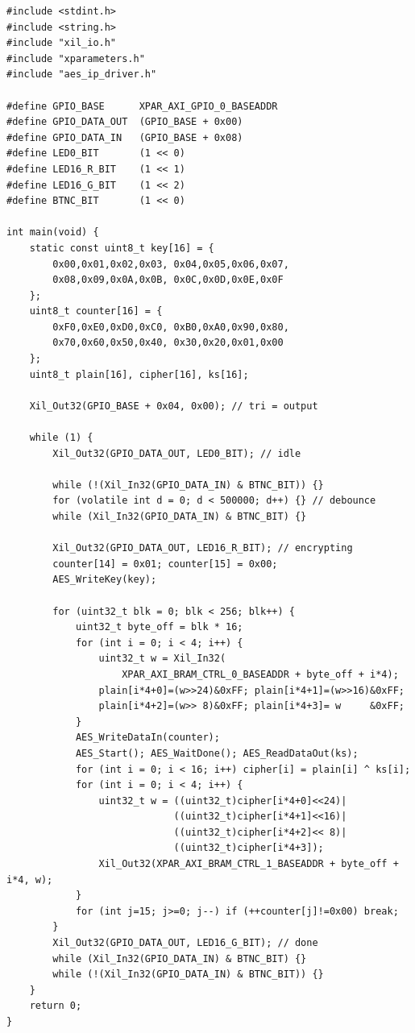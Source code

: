 \begin{lstlisting}[style=cstyle, caption={main.c -- AES-128 CTR Image Encryption Firmware (JTAG-Only)}]
#include <stdint.h>
#include <string.h>
#include "xil_io.h"
#include "xparameters.h"
#include "aes_ip_driver.h"

#define GPIO_BASE      XPAR_AXI_GPIO_0_BASEADDR
#define GPIO_DATA_OUT  (GPIO_BASE + 0x00)
#define GPIO_DATA_IN   (GPIO_BASE + 0x08)
#define LED0_BIT       (1 << 0)
#define LED16_R_BIT    (1 << 1)
#define LED16_G_BIT    (1 << 2)
#define BTNC_BIT       (1 << 0)

int main(void) {
    static const uint8_t key[16] = {
        0x00,0x01,0x02,0x03, 0x04,0x05,0x06,0x07,
        0x08,0x09,0x0A,0x0B, 0x0C,0x0D,0x0E,0x0F
    };
    uint8_t counter[16] = {
        0xF0,0xE0,0xD0,0xC0, 0xB0,0xA0,0x90,0x80,
        0x70,0x60,0x50,0x40, 0x30,0x20,0x01,0x00
    };
    uint8_t plain[16], cipher[16], ks[16];

    Xil_Out32(GPIO_BASE + 0x04, 0x00); // tri = output

    while (1) {
        Xil_Out32(GPIO_DATA_OUT, LED0_BIT); // idle

        while (!(Xil_In32(GPIO_DATA_IN) & BTNC_BIT)) {}
        for (volatile int d = 0; d < 500000; d++) {} // debounce
        while (Xil_In32(GPIO_DATA_IN) & BTNC_BIT) {}

        Xil_Out32(GPIO_DATA_OUT, LED16_R_BIT); // encrypting
        counter[14] = 0x01; counter[15] = 0x00;
        AES_WriteKey(key);

        for (uint32_t blk = 0; blk < 256; blk++) {
            uint32_t byte_off = blk * 16;
            for (int i = 0; i < 4; i++) {
                uint32_t w = Xil_In32(
                    XPAR_AXI_BRAM_CTRL_0_BASEADDR + byte_off + i*4);
                plain[i*4+0]=(w>>24)&0xFF; plain[i*4+1]=(w>>16)&0xFF;
                plain[i*4+2]=(w>> 8)&0xFF; plain[i*4+3]= w     &0xFF;
            }
            AES_WriteDataIn(counter);
            AES_Start(); AES_WaitDone(); AES_ReadDataOut(ks);
            for (int i = 0; i < 16; i++) cipher[i] = plain[i] ^ ks[i];
            for (int i = 0; i < 4; i++) {
                uint32_t w = ((uint32_t)cipher[i*4+0]<<24)|
                             ((uint32_t)cipher[i*4+1]<<16)|
                             ((uint32_t)cipher[i*4+2]<< 8)|
                             ((uint32_t)cipher[i*4+3]);
                Xil_Out32(XPAR_AXI_BRAM_CTRL_1_BASEADDR + byte_off + i*4, w);
            }
            for (int j=15; j>=0; j--) if (++counter[j]!=0x00) break;
        }
        Xil_Out32(GPIO_DATA_OUT, LED16_G_BIT); // done
        while (Xil_In32(GPIO_DATA_IN) & BTNC_BIT) {}
        while (!(Xil_In32(GPIO_DATA_IN) & BTNC_BIT)) {}
    }
    return 0;
}
\end{lstlisting}

